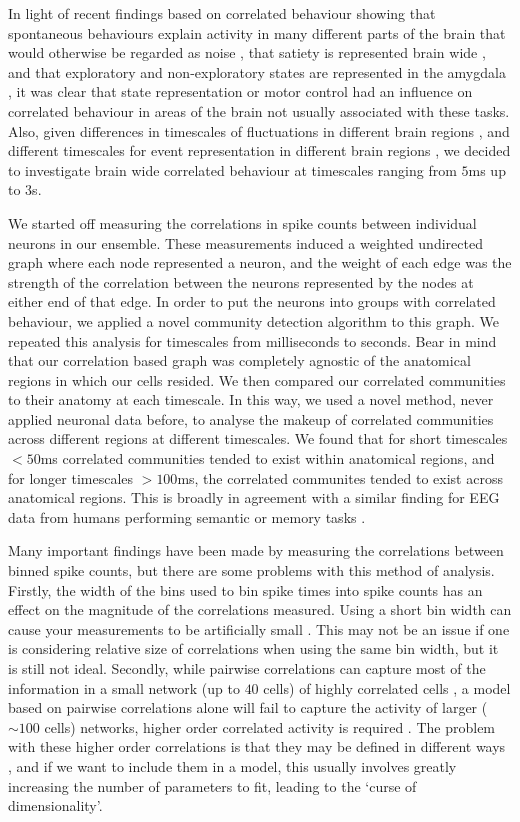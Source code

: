 In light of recent findings based on correlated behaviour showing that spontaneous behaviours explain activity in many different parts of the brain that would otherwise be regarded as noise \parencite{stringer}, that satiety is represented brain wide \cite{allen}, and that exploratory and non-exploratory states are represented in the amygdala \cite{grundemann}, it was clear that state representation or motor control had an influence on correlated behaviour in areas of the brain not usually associated with these tasks. Also, given differences in timescales of fluctuations in different brain regions \cite{murray}, and different timescales for event representation in different brain regions \cite{baldassano}, we decided to investigate brain wide correlated behaviour at timescales ranging from $5$ms up to $3$s.

We started off measuring the correlations in spike counts between individual neurons in our ensemble. These measurements induced a weighted undirected graph where each node represented a neuron, and the weight of each edge was the strength of the correlation between the neurons represented by the nodes at either end of that edge. In order to put the neurons into groups with correlated behaviour, we applied a novel community detection algorithm \parencite{humphries} to this graph. We repeated this analysis for timescales from milliseconds to seconds. Bear in mind that our correlation based graph was completely agnostic of the anatomical regions in which our cells resided. We then compared our correlated communities to their anatomy at each timescale. In this way, we used a novel method, never applied neuronal data before, to analyse the makeup of correlated communities across different regions at different timescales. We found that for short timescales $<50$ms correlated communities tended to exist within anatomical regions, and for longer timescales $>100$ms, the correlated communites tended to exist across anatomical regions. This is broadly in agreement with a similar finding for EEG data from humans performing semantic or memory tasks \parencite{von_stein}.

Many important findings have been made by measuring the correlations between binned spike counts, but there are some problems with this method of analysis. Firstly, the width of the bins used to bin spike times into spike counts has an effect on the magnitude of the correlations measured. Using a short bin width can cause your measurements to be artificially small \parencite{cohen2}. This may not be an issue if one is considering relative size of correlations when using the same bin width, but it is still not ideal. Secondly, while pairwise correlations can capture most of the information in a small network (up to $40$ cells) of highly correlated cells \parencite{schneidman}, a model based on pairwise correlations alone will fail to capture the activity of larger ($\sim 100$ cells) networks, higher order correlated activity is required \parencite{ganmor}. The problem with these higher order correlations is that they may be defined in different ways \parencite{staude}, and if we want to include them in a model, this usually involves greatly increasing the number of parameters to fit, leading to the `curse of dimensionality'.

